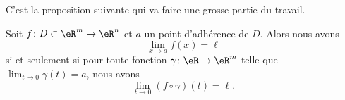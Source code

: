 \newcommand{\CaptionFigMethodeChemin}{Sur toute la droite \( y=-x\), la fonction vaut \( -1/2\), tandis que sur toute la droite \( y=x/2\), elle vaut \( \frac{2}{ 5 }\). Il est donc impossible que la fonction ait une limite en \( (0,0)\), parce que dans toute boule autour de zéro, il y aura toujours un point de chacune de ces deux droites.}


C'est la proposition suivante qui va faire une grosse partie du travail.
\begin{proposition}     \label{PROPooSAFIooWvmSiT}
	Soit \( f\colon D\subset\eR^m\to \eR^n\) et \( a\) un point d'adhérence de \( D\). Alors nous avons
	\begin{equation}
		\lim_{x\to a} f(x)=\ell
	\end{equation}
	si et seulement si pour toute fonction \( \gamma\colon \eR\to \eR^m\) telle que \( \lim_{t\to 0} \gamma(t)=a\), nous avons
	\begin{equation}
		\lim_{t\to 0} (f\circ\gamma)(t)=\ell.
	\end{equation}
\end{proposition}

